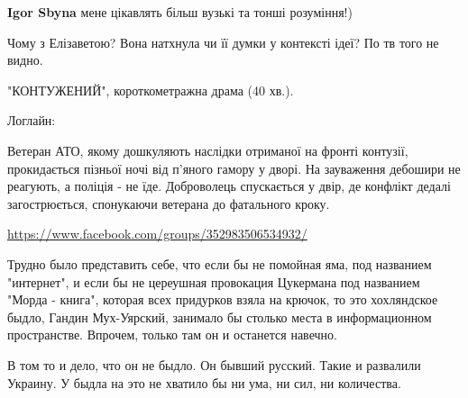\begin{itemize}
\begin{itemize}
\textbf{Igor Sbyna} мене цікавлять більш вузькі та тонші розуміння!)

\end{itemize}

 
Чому з Елізаветою? Вона натхнула чи її думки у контексті ідеї? По тв того не видно.

 

"КОНТУЖЕНИЙ", короткометражна драма (40 хв.).

Логлайн:

Ветеран АТО, якому дошкуляють наслідки отриманої на фронті контузії,
прокидається пізньої ночі від п'яного гамору у дворі. На зауваження дебошири не
реагують, а поліція - не їде. Доброволець спускається у двір, де конфлікт
дедалі загострюється, спонукаючи ветерана до фатального кроку.

\url{https://www.facebook.com/groups/352983506534932/}

 

Трудно было представить себе, что если бы не помойная яма, под названием
"интернет", и если бы не цереушная провокация Цукермана под названием "Морда -
книга", которая всех придурков взяла на крючок, то это хохляндское быдло,
Гандин Мух-Уярский, занимало бы столько места в информационном пространстве.
Впрочем, только там он и останется навечно.

\begin{itemize}
 

В том то и дело, что он не быдло. Он бывший русский. Такие и развалили Украину.
У быдла на это не хватило бы ни ума, ни сил, ни количества.


\end{itemize}
\end{itemize}

